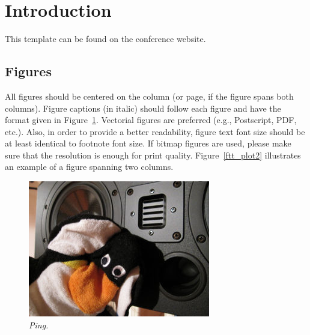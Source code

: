 \documentclass[twoside,a4paper]{article}
\title{\papertitle}
\begin{document}
\maketitle

\begin{abstract}
This is the template file for the proceedings of the 18$^{\text{th}}$ 
Linux Audio Conference (LAC-20).
This template has been derived from DAFx-16, IFC-18, LAC-19 templates and aims at 
producing conference proceedings in electronic form.
The format is essentially the one used for ICASSP conferences. Please use
either this \LaTeX{} or the accompanying LibreOffice formats when preparing your
submission. 
\end{abstract}

\section{Introduction}
\label{sec:intro}

This template can be found on the conference website.

\subsection{Figures}
\label{ssec:figures}

All figures should be centered on the column (or page, if the figure spans both
columns). Figure captions (in italic) should follow each figure and have the
format given in Figure~\ref{fft_plot}. Vectorial figures are preferred (e.g.,
Postscript, PDF, etc.). Also, in order to provide a better readability, figure
text font size should be at least identical to footnote font size. If bitmap
figures are used, please make sure that the resolution is enough for print
quality. Figure~\ref{ftt_plot2} illustrates an example of a figure spanning two
columns.

\begin{figure}[ht]
\centerline{\includegraphics[scale=0.5]{ping}}
\caption{\label{fft_plot}{\it Ping.}}
\end{figure}
\end{document}
